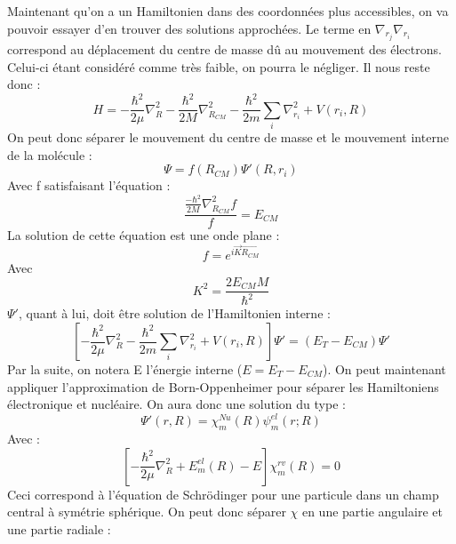 Maintenant qu'on a un Hamiltonien dans des coordonnées plus accessibles, on va pouvoir essayer d'en trouver des solutions approchées.\newline
Le terme en $\nabla_{r_j}\nabla_{r_i}$ correspond au déplacement du centre de masse dû au mouvement des électrons. Celui-ci étant considéré comme très faible, on pourra le négliger.\newline
Il nous reste donc : 
\begin{equation*}
    H = -\frac{\hbar^2}{2\mu}\nabla^2_R - \frac{\hbar^2}{2M}\nabla^2_{R_{CM}} -\frac{\hbar^2}{2m}\sum\limits_i \nabla^2_{r_{i}} + V(r_i, R)
\end{equation*}
On peut donc séparer le mouvement du centre de masse et le mouvement interne de la molécule : 
\begin{equation*}
    \Psi = f(R_{CM})\Psi'(R,r_i)
\end{equation*}
Avec f satisfaisant l'équation : 
\begin{equation*}
    \frac{\frac{-\hbar^2}{2M}\nabla^2_{R_{CM}}f}{f} = E_{CM}
\end{equation*}
La solution de cette équation est une onde plane :
\begin{equation*}
    f = e^{i\Vec{K}\Vec{R_{CM}}}
\end{equation*}
Avec
\begin{equation*}
    K^2 = \frac{2E_{CM}M}{\hbar^2}
\end{equation*}
$\Psi'$, quant à lui, doit être solution de l'Hamiltonien interne :
\begin{equation*}
    \left[-\frac{\hbar^2}{2\mu}\nabla^2_R - \frac{\hbar^2}{2m}\sum\limits_i \nabla^2_{r_{i}} + V(r_i, R)\right]\Psi' = (E_T-E_{CM})\Psi'
\end{equation*}
Par la suite, on notera E l'énergie interne ($E = E_T - E_{CM}$).\newline
On peut maintenant appliquer l'approximation de Born-Oppenheimer pour séparer les Hamiltoniens électronique et nucléaire. On aura donc une solution du type : 
\begin{equation*}
    \Psi'(r,R) = \chi^{Nu}_m(R)\psi^{el}_m(r;R)
\end{equation*}
Avec : 
\begin{equation*}
    \left[-\frac{\hbar^2}{2\mu}\nabla^2_R + E^{el}_m(R) - E\right] \chi^{rv}_m(R) = 0
\end{equation*}
Ceci correspond à l'équation de Schrödinger pour une particule dans un champ central à symétrie sphérique. On peut donc séparer $\chi$ en une partie angulaire et une partie radiale : 
